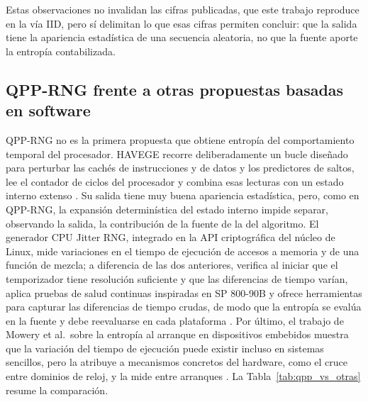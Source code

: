 Estas observaciones no invalidan las cifras publicadas, que este trabajo reproduce en la vía IID, pero sí delimitan lo que esas cifras permiten concluir: que la salida tiene la apariencia estadística de una secuencia aleatoria, no que la fuente aporte la entropía contabilizada.

\subsection{QPP-RNG frente a otras propuestas basadas en software}
\label{sec:qpp_vs_otras}

QPP-RNG no es la primera propuesta que obtiene entropía del comportamiento temporal del procesador. HAVEGE recorre deliberadamente un bucle diseñado para perturbar las cachés de instrucciones y de datos y los predictores de saltos, lee el contador de ciclos del procesador y combina esas lecturas con un estado interno extenso \cite{Seznec2003HAVEGE}. Su salida tiene muy buena apariencia estadística, pero, como en QPP-RNG, la expansión determinística del estado interno impide separar, observando la salida, la contribución de la fuente de la del algoritmo. El generador CPU Jitter RNG, integrado en la API criptográfica del núcleo de Linux, mide variaciones en el tiempo de ejecución de accesos a memoria y de una función de mezcla; a diferencia de las dos anteriores, verifica al iniciar que el temporizador tiene resolución suficiente y que las diferencias de tiempo varían, aplica pruebas de salud continuas inspiradas en SP 800-90B y ofrece herramientas para capturar las diferencias de tiempo crudas, de modo que la entropía se evalúa en la fuente y debe reevaluarse en cada plataforma \cite{Muller2024JitterNPTRNG}. Por último, el trabajo de Mowery et al.\ sobre la entropía al arranque en dispositivos embebidos muestra que la variación del tiempo de ejecución puede existir incluso en sistemas sencillos, pero la atribuye a mecanismos concretos del hardware, como el cruce entre dominios de reloj, y la mide entre arranques \cite{Mowery2013Entropics}. La Tabla~\ref{tab:qpp_vs_otras} resume la comparación.

